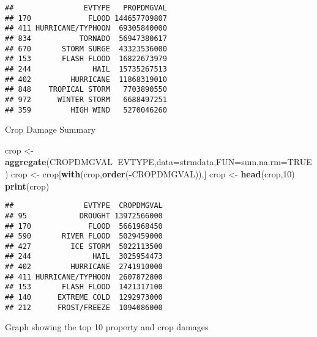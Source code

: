 \documentclass[
]{article}
\newenvironment{Shaded}{\begin{snugshade}}{\end{snugshade}}
\newcommand{\DataTypeTok}[1]{\textcolor[rgb]{0.13,0.29,0.53}{#1}}
\newcommand{\DecValTok}[1]{\textcolor[rgb]{0.00,0.00,0.81}{#1}}
\newcommand{\KeywordTok}[1]{\textcolor[rgb]{0.13,0.29,0.53}{\textbf{#1}}}
\newcommand{\NormalTok}[1]{#1}
\newcommand{\OperatorTok}[1]{\textcolor[rgb]{0.81,0.36,0.00}{\textbf{#1}}}
\newcommand{\OtherTok}[1]{\textcolor[rgb]{0.56,0.35,0.01}{#1}}
\newcommand{\StringTok}[1]{\textcolor[rgb]{0.31,0.60,0.02}{#1}}
\begin{document}
\begin{verbatim}
##                EVTYPE   PROPDMGVAL
## 170             FLOOD 144657709807
## 411 HURRICANE/TYPHOON  69305840000
## 834           TORNADO  56947380617
## 670       STORM SURGE  43323536000
## 153       FLASH FLOOD  16822673979
## 244              HAIL  15735267513
## 402         HURRICANE  11868319010
## 848    TROPICAL STORM   7703890550
## 972      WINTER STORM   6688497251
## 359         HIGH WIND   5270046260
\end{verbatim}

Crop Damage Summary

\begin{Shaded}
\begin{Highlighting}[]
\NormalTok{crop <-}\StringTok{ }\KeywordTok{aggregate}\NormalTok{(CROPDMGVAL}\OperatorTok{~}\NormalTok{EVTYPE,}\DataTypeTok{data=}\NormalTok{strmdata,}\DataTypeTok{FUN=}\NormalTok{sum,}\DataTypeTok{na.rm=}\OtherTok{TRUE}\NormalTok{)}
\NormalTok{crop <-}\StringTok{ }\NormalTok{crop[}\KeywordTok{with}\NormalTok{(crop,}\KeywordTok{order}\NormalTok{(}\OperatorTok{-}\NormalTok{CROPDMGVAL)),]}
\NormalTok{crop <-}\StringTok{ }\KeywordTok{head}\NormalTok{(crop,}\DecValTok{10}\NormalTok{)}
\KeywordTok{print}\NormalTok{(crop)}
\end{Highlighting}
\end{Shaded}

\begin{verbatim}
##                EVTYPE  CROPDMGVAL
## 95            DROUGHT 13972566000
## 170             FLOOD  5661968450
## 590       RIVER FLOOD  5029459000
## 427         ICE STORM  5022113500
## 244              HAIL  3025954473
## 402         HURRICANE  2741910000
## 411 HURRICANE/TYPHOON  2607872800
## 153       FLASH FLOOD  1421317100
## 140      EXTREME COLD  1292973000
## 212      FROST/FREEZE  1094086000
\end{verbatim}

Graph showing the top 10 property and crop damages
\end{document}

